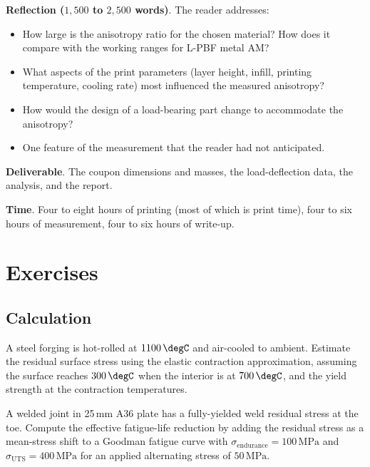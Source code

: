 \begin{project}
\textbf{Reflection ($1{,}500$ to $2{,}500$ words)}. The reader
addresses:

\begin{itemize}[leftmargin=*]
\item How large is the anisotropy ratio for the chosen material? How
  does it compare with the working ranges for L-PBF metal AM?
\item What aspects of the print parameters (layer height, infill,
  printing temperature, cooling rate) most influenced the measured
  anisotropy?
\item How would the design of a load-bearing part change to
  accommodate the anisotropy?
\item One feature of the measurement that the reader had not
  anticipated.
\end{itemize}

\textbf{Deliverable}. The coupon dimensions and masses, the
load-deflection data, the analysis, and the report.

\textbf{Time}. Four to eight hours of printing (most of which is
print time), four to six hours of measurement, four to six hours of
write-up.
\end{project}

\section{Exercises}

\subsection*{Calculation}

\begin{exercise}
A steel forging is hot-rolled at $1100\,\degC$ and air-cooled to
ambient. Estimate the residual surface stress using the elastic
contraction approximation, assuming the surface reaches $300\,\degC$
when the interior is at $700\,\degC$, and the yield strength at the
contraction temperatures.
\end{exercise}

\begin{exercise}
A welded joint in 25\,mm A36 plate has a fully-yielded weld residual
stress at the toe. Compute the effective fatigue-life reduction by
adding the residual stress as a mean-stress shift to a Goodman
fatigue curve with $\sigma_{\text{endurance}} = 100\,\text{MPa}$ and
$\sigma_{\text{UTS}} = 400\,\text{MPa}$ for an applied alternating
stress of $50\,\text{MPa}$.
\end{exercise}

